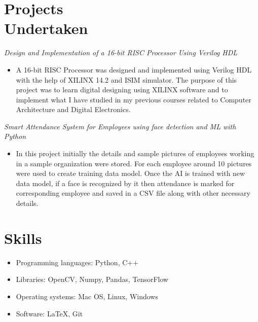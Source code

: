 \documentclass[resmargin, 10pt]{res} %
\begin{document}
\begin{resume}
\section{Projects\\Undertaken}
{\sl Design and Implementation of a 16-bit RISC Processor Using Verilog HDL}
\vspace{1.2em}
\begin{itemize}\itemsep -2pt
\item A 16-bit RISC Processor was designed and implemented using Verilog HDL with the help of XILINX 14.2 and ISIM simulator. The purpose of this project was to learn digital designing using XILINX software and to implement what I
have studied in my previous courses related to Computer Architecture and Digital Electronics.
\end{itemize}  
\vspace{4.7em}
{\sl Smart Attendance System for Employees using face detection and ML with Python}
\vspace{1.2em}
\begin{itemize}\itemsep -2pt
\item In this project initially the details and sample pictures of employees working in a sample organization were
stored. For each employee around 10 pictures were used to create training data model. Once the AI is trained
with new data model, if a face is recognized by it then attendance is marked for corresponding employee and
saved in a CSV file along with other necessary details.

\end{itemize} 

\section{Skills}
\begin{itemize} \itemsep -2pt
\item Programming languages: Python, C++
\item Libraries: OpenCV, Numpy, Pandas, TensorFlow
\item Operating systems: Mac OS, Linux, Windows
\item Software: LaTeX, Git



\end{itemize}
\end{resume}
\end{document}
